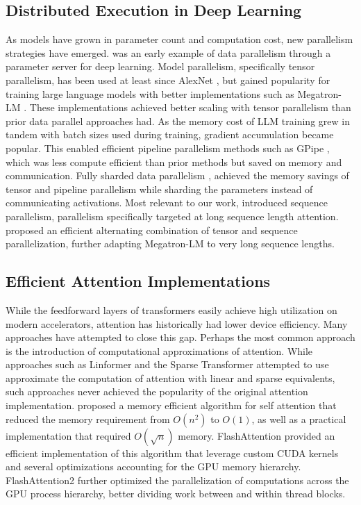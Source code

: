 \subsection{Distributed Execution in Deep Learning} As models have grown in parameter count and computation cost, new parallelism strategies have emerged.
\citet{dean2012data} was an early example of data parallelism through a parameter server for deep learning. Model parallelism, specifically tensor parallelism, has been used at least since AlexNet \cite{alexnet}, but gained popularity for training large language models with better implementations  such as Megatron-LM \cite{megatronlm}. These implementations achieved better scaling with tensor parallelism than prior data parallel approaches had. As the memory cost of LLM training grew in tandem with batch sizes used during training, gradient accumulation became popular. This enabled efficient pipeline parallelism methods such as GPipe \cite{gpipe2018}, which was less compute efficient than prior methods but saved on memory and communication. Fully sharded data parallelism \cite{fsdp2021}, achieved the memory savings of tensor and pipeline parallelism while sharding the parameters instead of communicating activations. Most relevant to our work, \cite{li2022sequence} introduced sequence parallelism, parallelism specifically targeted at long sequence length attention. \cite{korthikanti2022reducing} proposed an efficient alternating combination of tensor and sequence parallelization, further adapting Megatron-LM to very long sequence lengths. 

\subsection{Efficient Attention Implementations} While the feedforward layers of transformers easily achieve high utilization on modern accelerators, attention has historically had lower device efficiency. Many approaches have attempted to close this gap. Perhaps the most common approach is the introduction of computational approximations of attention. While approaches such as Linformer \cite{linformer2020} and the Sparse Transformer \cite{sparsetransformer2019} attempted to use approximate the computation of attention with linear and sparse equivalents, such approaches never achieved the popularity of the original attention implementation. \cite{rabe2021self} proposed a memory efficient algorithm for self attention that reduced the memory requirement from $O(n^2)$ to $O(1)$, as well as a practical implementation that required $O(\sqrt{n})$ memory. FlashAttention \cite{flash_attention} provided an efficient implementation of this algorithm that leverage custom CUDA kernels and several optimizations accounting for the GPU memory hierarchy. FlashAttention2 \cite{dao2023flashattention} further optimized the parallelization of computations across the GPU process hierarchy, better dividing work between and within thread blocks. 

